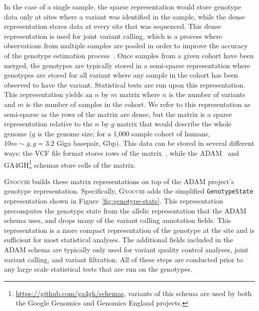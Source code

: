 \documentclass[11pt]{article} %
\begin{document}
In the case of a single sample, the sparse representation would store genotype
data only at sites where a variant was identified in the sample, while the
dense representation stores data at every site that was sequenced. This dense
representation is used for joint variant calling, which is a process where
observations from multiple samples are pooled in order to improve the accuracy
of the genotype estimation process~\cite{li11}. Once samples from a given cohort
have been merged, the genotypes are typically stored in a semi-sparse
representation where genotypes are stored for all variant where any sample in
the cohort has been observed to have the variant. Statistical tests are run upon
this representation. This representation yields an $n$ by $m$ matrix where $n$
is the number of variants and $m$ is the number of samples in the cohort. We
refer to this representation as semi-sparse as the rows of the matrix are
dense, but the matrix is a sparse representation relative to the $n$ by $g$
matrix that would describe the whole genome ($g$ is the genome size; for a 1,000
sample cohort of humans, $10 m \sim g, g = 3.2$ Giga basepair, Gbp). This data
can be stored in several different ways: the \textsc{VCF} file format stores
rows of the matrix~\cite{danecek11}, while the \textsc{ADAM}~\cite{nothaft15}
and \textsc{GA4GH}\footnote{\url{https://github.com/ga4gh/schemas}, variants of
this schema are used by both the Google Genomics and Genomics England projects.}
schemas store cells of the matrix.

\textsc{Gnocchi} builds these matrix representations on top of the \textsc{ADAM}
project's genotype representation. Specifically, \textsc{Gnocchi} adds the
simplified \texttt{GenotypeState} representation shown in
Figure~\ref{fig:genotype-state}. This representation precomputes the genotype
state from the allelic representation that the \textsc{ADAM} schema uses, and
drops many of the variant calling annotation fields. This representation is
a more compact representation of the genotype at the site and is sufficient for
most statistical analyses. The additional fields included in the \textsc{ADAM}
schema are typically only used for variant quality control analyses, joint
variant calling, and variant filtration. All of these steps are conducted prior
to any large scale statistical tests that are run on the genotypes.
\end{document}
